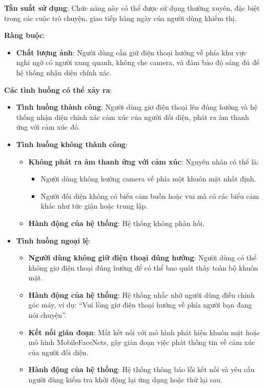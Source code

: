 \documentclass[a4paper,12pt]{article}
\begin{document}
\textbf{Tần suất sử dụng}: Chức năng này có thể được sử dụng thường xuyên, đặc biệt trong các cuộc trò chuyện, giao tiếp hàng ngày của người dùng khiếm thị.

\textbf{Ràng buộc}:
\begin{itemize}
    \item \textbf{Chất lượng ảnh}: Người dùng cần giữ điện thoại hướng về phía khu vực nghi ngờ có người xung quanh, không che camera, và đảm bảo độ sáng đủ để hệ thống nhận diện chính xác.
\end{itemize}

\textbf{Các tình huống có thể xảy ra}:

\begin{itemize}
    \item \textbf{Tình huống thành công}: Người dùng giơ điện thoại lên đúng hướng và hệ thống nhận diện chính xác cảm xúc của người đối diện, phát ra âm thanh ứng với cảm xúc đó.
    \item \textbf{Tình huống không thành công}:
    \begin{itemize}
        \item \textbf{Không phát ra âm thanh ứng với cảm xúc}: Nguyên nhân có thể là:
        \begin{itemize}
            \item Người dùng không hướng camera về phía một khuôn mặt nhất định.
            \item Người đối diện không có biểu cảm buồn hoặc vui mà có các biểu cảm khác như tức giận hoặc trung lập.
        \end{itemize}
        \item \textbf{Hành động của hệ thống}: Hệ thống không phản hồi.
    \end{itemize}
    \item \textbf{Tình huống ngoại lệ}:
    \begin{itemize}
        \item \textbf{Người dùng không giữ điện thoại đúng hướng}: Người dùng có thể không giơ điện thoại đúng hướng để có thể bao quát thấy toàn bộ khuôn mặt.
        \item \textbf{Hành động của hệ thống}: Hệ thống nhắc nhở người dùng điều chỉnh góc máy, ví dụ: “Vui lòng giơ điện thoại hướng về phía người bạn đang nói chuyện”.
        \item \textbf{Kết nối gián đoạn}: Mất kết nối với mô hình phát hiện khuôn mặt hoặc mô hình MobileFaceNets, gây gián đoạn việc phát thông tin về cảm xúc của người đối diện.
        \item \textbf{Hành động của hệ thống}: Hệ thống thông báo lỗi kết nối và yêu cầu người dùng kiểm tra khởi động lại ứng dụng hoặc thử lại sau.
    \end{itemize}
\end{itemize}
\end{document}
